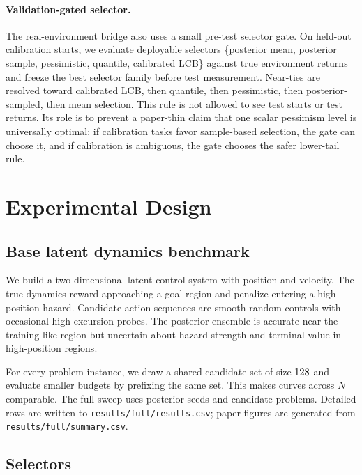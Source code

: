 \documentclass{article}
\begin{document}
\paragraph{Validation-gated selector.}
The real-environment bridge also uses a small pre-test selector gate. On
held-out calibration starts, we evaluate deployable selectors
\{posterior mean, posterior sample, pessimistic, quantile, calibrated LCB\}
against true environment returns and freeze the best selector family before
test measurement. Near-ties are resolved toward calibrated LCB, then quantile,
then pessimistic, then posterior-sampled, then mean selection. This rule is not
allowed to see test starts or test returns. Its role is to prevent a paper-thin
claim that one scalar pessimism level is universally optimal; if calibration
tasks favor sample-based selection, the gate can choose it, and if calibration
is ambiguous, the gate chooses the safer lower-tail rule.

\section{Experimental Design}

\subsection{Base latent dynamics benchmark}

We build a two-dimensional latent control system with position and velocity.
The true dynamics reward approaching a goal region and penalize entering a
high-position hazard. Candidate action sequences are smooth random controls
with occasional high-excursion probes. The posterior ensemble is accurate near
the training-like region but uncertain about hazard strength and terminal
value in high-position regions.

For every problem instance, we draw a shared candidate set of size
$128{}$ and evaluate smaller budgets by prefixing the same set. This
makes curves across $N$ comparable. The full sweep uses \PaperSeeds{} posterior
seeds and \PaperProblems{} candidate problems. Detailed rows are written to
\texttt{results/full/results.csv}; paper figures are generated from
\texttt{results/full/summary.csv}.

\subsection{Selectors}
\end{document}
